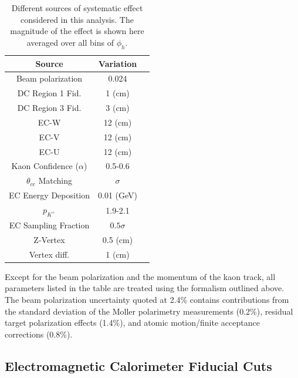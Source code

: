 \begin{table}
  \centering
  \begin{tabular}{c|c|c}
    Source                     & Variation  \\ 
    \hline
    Beam polarization                  & 0.024        \\ 
    DC Region 1 Fid.                     & 1 (cm)         \\ 
    DC Region 3 Fid.                    & 3 (cm)        \\
    EC-W                                       & 12 (cm)         \\ 
    EC-V                                        & 12 (cm)        \\
    EC-U                                        & 12 (cm)        \\
    Kaon Confidence ($\alpha$) & 0.5-0.6     \\
    $\theta_{cc}$ Matching         & $\sigma$        \\
    EC Energy Deposition            & 0.01 (GeV)      \\
    $p_{K^+}$                               & 1.9-2.1  \\ 
    EC Sampling Fraction             & $0.5 \sigma$    \\
    Z-Vertex                                  & 0.5 (cm)        \\
    Vertex diff.                              & 1 (cm)  \\
    \hline 
  \end{tabular}
  \caption{Different sources of systematic effect considered in this analysis.  The magnitude of the effect is shown here averaged over all bins of $\phi_h$.}
  \label{table:kaon-systematics}
\end{table}

Except for the beam polarization and the momentum of the kaon track, all parameters listed in the table are treated using the formalism outlined above.  The beam polarization uncertainty quoted at 2.4\% contains contributions from the standard deviation of the Moller polarimetry measurements (0.2\%), residual target polarization effects (1.4\%), and atomic motion/finite acceptance corrections (0.8\%).\\

\subsection{Electromagnetic Calorimeter Fiducial Cuts}

